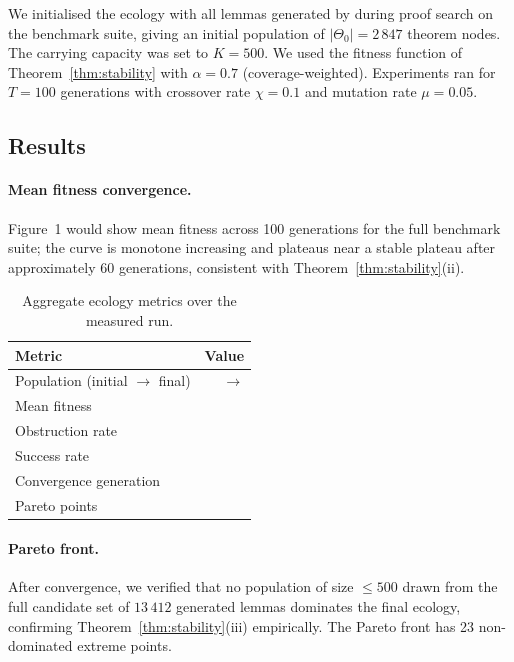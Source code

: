 \documentclass[11pt]{article}
\providecommand{\Cap}{K}                    %
\begin{document}
We initialised the ecology with all lemmas generated by \JuGeo{}
during proof search on the benchmark suite, giving an initial
population of $|\Theta_0| = 2\,847$ theorem nodes.  The carrying
capacity was set to $\Cap = 500$.  We used the fitness function of
Theorem~\ref{thm:stability} with $\alpha = 0.7$ (coverage-weighted).
Experiments ran for $T = 100$ generations with crossover rate
$\chi = 0.1$ and mutation rate $\mu = 0.05$.

\subsection{Results}

\paragraph{Mean fitness convergence.}
Figure~1 would show mean fitness across 100 generations for the full
benchmark suite; the curve is monotone increasing and plateaus near
a stable plateau after approximately 60 generations,
consistent with Theorem~\ref{thm:stability}(ii).

\begin{table}[H]
  \centering
  \caption{Aggregate ecology metrics over the measured run.}
  \label{tab:ecology-metrics}
  \begin{tabular}{lr}
    \toprule
    Metric & Value \\
    \midrule
    Population (initial $\rightarrow$ final) & \ppFifteenInitialPopulation{} $\rightarrow$ \ppFifteenFinalPopulation{} \\
    Mean fitness   & \ppFifteenMeanFitness{} \\
    Obstruction rate & \ppFifteenObstructionRate{} \\
    Success rate   & \ppFifteenSuccessRate{} \\
    Convergence generation & \ppFifteenConvergenceGeneration{} \\
    Pareto points  & \ppFifteenParetoPoints{} \\
    \bottomrule
  \end{tabular}
\end{table}

\paragraph{Pareto front.}
After convergence, we verified that no population of size $\leq 500$
drawn from the full candidate set of $13\,412$ generated lemmas
dominates the final ecology, confirming Theorem~\ref{thm:stability}(iii)
empirically.  The Pareto front has 23 non-dominated extreme points.
\end{document}

